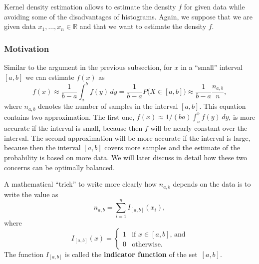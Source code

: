 \documentclass[
  a4paper,
]{article}
\theoremstyle{definition}
\theoremstyle{definition}
\theoremstyle{definition}
\theoremstyle{definition}
\theoremstyle{remark}
\begin{document}
Kernel density estimation allows to estimate the density \(f\) for given
data while avoiding some of the disadvantages of histograms.
Again, we suppose that we are given data \(x_1, \ldots, x_n \in \mathbb{R}\)
and that we want to estimate the density \(f\).

\hypertarget{motivation}{%
\subsubsection{Motivation}\label{motivation}}

Similar to the argument in the previous subsection, for \(x\) in a ``small''
interval \([a,b]\) we can estimate \(f(x)\) as
\begin{equation*}
  f(x)
  \approx \frac{1}{b-a} \int_a^b f(y) \,dy
  = \frac{1}{b-a} P\bigl( X\in [a,b] \bigr)
  \approx \frac{1}{b-a} \frac{n_{a,b}}{n},
\end{equation*}
where \(n_{a,b}\) denotes the number of samples in the interval \([a, b]\).
This equation contains two approximation. The first one,
\(f(x) \approx 1/(ba) \int_a^b f(y) \,dy\), is more accurate if the
interval is small, because then \(f\) will be nearly constant over the
interval. The second approximation will be more accurate if the
interval is large, because then the interval \([a,b]\) covers more samples
and the estimate of the probability is based on more data. We will later
discuss in detail how these two concerns can be optimally balanced.

A mathematical ``trick'' to write more clearly how \(n_{a,b}\) depends on the
data is to write the value as
\begin{equation*}
  n_{a,b}
  = \sum_{i=1}^n I_{[a,b]}(x_i),
\end{equation*}
where
\begin{equation*}
  I_{[a,b]}(x)
  = \begin{cases}
    1 & \mbox{if $x \in [a,b]$, and} \\
    0 & \mbox{otherwise.}
  \end{cases}
\end{equation*}
The function \(I_{[a,b]}\) is called the \textbf{indicator function} of the
set~\([a, b]\).
\end{document}
